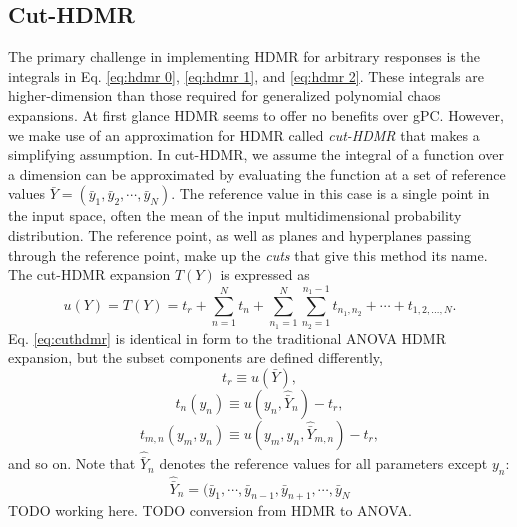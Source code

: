 \subsection{Cut-HDMR}
The primary challenge in implementing HDMR for arbitrary responses is the integrals in Eq. \ref{eq:hdmr 0},
\ref{eq:hdmr 1}, and \ref{eq:hdmr 2}.  These integrals are higher-dimension than those required for
generalized polynomial chaos expansions.  At first glance HDMR seems to offer no benefits over gPC.  However,
we make use of an approximation for HDMR called \emph{cut-HDMR} \cite{cutHDMR} that makes a simplifying assumption.
In cut-HDMR, we assume the integral of a function over a dimension can be approximated by evaluating the
function at a set of reference values $\bar Y = (\bar y_1,\bar y_2,\cdots,\bar y_N)$.  The reference value in this case
is a single point in the input space, often the mean of the input multidimensional probability distribution.  The
reference point, as well as planes and hyperplanes passing through the reference point, make up the
\emph{cuts} that give this method its name.  The cut-HDMR expansion $T(Y)$ is expressed as
\begin{equation}\label{eq:cuthdmr}
  u(Y) = T(Y) = t_r + \sum_{n=1}^N t_n + \sum_{n_1=1}^N \sum_{n_2=1}^{n_1-1}
  t_{n_1,n_2}+\cdots+t_{1,2,\ldots,N}.
\end{equation}
Eq. \ref{eq:cuthdmr} is identical in form to the traditional ANOVA HDMR expansion, but the subset components
are defined differently,
\begin{equation}
  t_r \equiv u(\bar Y),
\end{equation}
\begin{equation}
  t_n(y_n) \equiv u(y_n,\hat\bar Y_n) - t_r,
\end{equation}
\begin{equation}
  t_{m,n}(y_m,y_n) \equiv u(y_m,y_n,\hat\bar Y_{m,n}) - t_r,
\end{equation}
and so on. Note that $\hat\bar Y_n$ denotes the reference values for all parameters except $y_n$:
\begin{equation}
  \hat\bar Y_n = (\bar y_1,\cdots,\bar y_{n-1},\bar y_{n+1},\cdots,\bar y_N
\end{equation}
TODO working here.
TODO conversion from HDMR to ANOVA.



